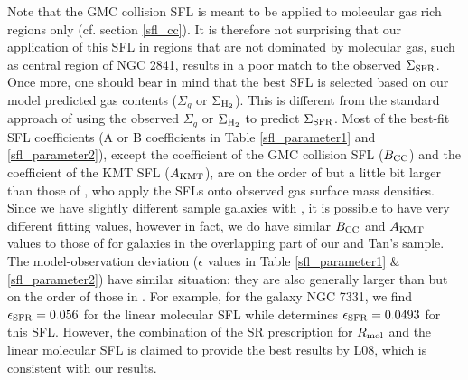 \documentclass[12pt,preprint]{aastex}
\begin{document}
Note that the GMC collision SFL is meant to be applied to molecular gas rich regions only (cf. section \ref{sfl_cc}). 
It is therefore not surprising that our application of this SFL in regions that are not dominated by molecular gas, 
such as central region of NGC 2841, results in a poor match to the observed $  \Sigma_{\rm SFR}$.
Once more, one should bear in mind that the best SFL is selected based on our model predicted gas contents ($  \Sigma_g$ or $  \Sigma_{\rm H_2}$). This is different from the standard approach of using the  observed $  \Sigma_g$ or $  \Sigma_{\rm H_2}$ to predict $  \Sigma_{\rm SFR}$. 
Most of the best-fit SFL coefficients (A or B coefficients in Table \ref{sfl_parameter1} and \ref{sfl_parameter2}), except the coefficient of the GMC collision SFL ($B_{\rm CC}$) and the coefficient of the KMT SFL ($A_{\rm KMT}$),  are on the order of but a little bit larger than those of \citet{tan10}, who apply the SFLs onto observed gas surface mass densities. 
Since we have slightly different sample galaxies with \citet{tan10}, it is possible to have very different fitting values, however in fact, we do have similar $B_{\rm CC}$ and $A_{\rm KMT}$ values to those of \citet{tan10} for galaxies in the overlapping part of our  and Tan's sample.
The model-observation deviation ($\epsilon$ values in Table \ref{sfl_parameter1} \& \ref{sfl_parameter2}) have similar situation: they are also generally larger than but on the order of those in \citet[][the $\chi$ values]{tan10}. 
For example, for the galaxy NGC 7331, we find  $\epsilon_{\rm SFR}= 0.056$ for the linear molecular SFL
while \citet{tan10} determines  $\epsilon_{\rm SFR}= 0.0493$ for this SFL.
However, the combination of the SR prescription for $R_{\rm mol}$ and the linear molecular SFL is claimed to provide the best results by L08, which is consistent with our results.
\end{document}
